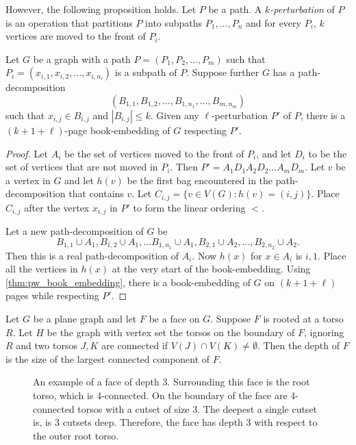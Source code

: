 However, the following proposition holds. Let $P$ be a path. A \textit{$k$-perturbation} of $P$ is an operation that partitions $P$ into subpaths $P_1, \ldots, P_n$ and for every $P_i$, $k$ vertices are moved to the front of $P_i$. 

\begin{proposition}\label{prop:k-perturbation}
	Let $G$ be a graph with a path $P = (P_1, P_2, \ldots, P_m)$ such that $P_i = (x_{i,1}, x_{i,2}, \ldots, x_{i, n_{i}})$ is a subpath of $P$. Suppose further $G$ has a path-decomposition \[(B_{1,1}, B_{1,2}, \ldots, B_{1,n_{1}}, \ldots, B_{m, n_{m}})\] such that $x_{i,j} \in B_{i,j}$ and $|B_{i,j}| \leq k$. Given any $\ell$-perturbation $P'$ of $P$, there is a $(k + 1 + \ell)$-page book-embedding of $G$ respecting $P'$.
\end{proposition}

\begin{proof}
	Let $A_i$ be the set of vertices moved to the front of $P_i$, and let $D_i$ to be the set of vertices that are not moved in $P_i$. Then $P' = A_1 D_1 A_2 D_2 \ldots A_m D_m$. 
	Let $v$ be a vertex in $G$ and let $h(v)$ be the first bag encountered in the path-decomposition that contains $v$.
	Let $C_{i,j} = \{v \in V(G): h(v) = (i,j)\}$. Place $C_{i,j}$ after the vertex $x_{i,j}$ in $P'$ to form the linear ordering $<$.

	Let a new path-decomposition of $G$ be \[B_{1,1} \cup A_1, B_{1,2} \cup A_1, \ldots B_{1, n_1} \cup A_1, B_{2,1} \cup A_2, \ldots, B_{2,n_2} \cup A_2.\] Then this is a real path-decomposition of $A_i$. Now $h(x)$ for $x \in A_i$ is ${i, 1}$. Place all the vertices in $h(x)$ at the very start of the book-embedding. Using \cref{thm:pw_book_embedding}, there is a book-embedding of $G$ on $(k + 1 + \ell)$ pages while respecting $P'$. 

\end{proof}

Let $G$ be a plane graph and let $F$ be a face on $G$. Suppose $F$ is rooted at a torso $R$. Let $H$ be the graph with vertex set the torsos on the boundary of $F$, ignoring $R$ and two torsos $J, K$ are connected if $V(J) \cap V(K) \neq \emptyset$. Then the depth of $F$ is the size of the largest connected component of $F$. 
\begin{figure}
	\centering
	
	\caption[Face of depth 3]{An example of a face of depth 3. Surrounding this face is the root torso, which is 4-connected. On the boundary of the face are 4-connected torsos with a cutset of size 3. The deepest a single cutset is, is 3 cutsets deep. Therefore, the face has depth 3 with respect to the outer root torso.}\label{fig:face_depth}
\end{figure}

